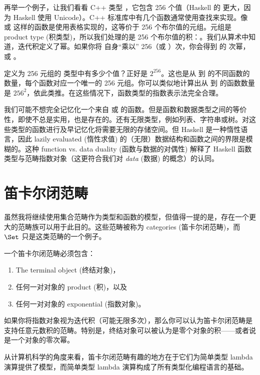 再举一个例子，让我们看看 C++ 类型 ，它包含 256 个值（Haskell 的  更大，因为 Haskell 使用 Unicode）。C++ 标准库中有几个函数通常使用查找来实现。像  或  这样的函数是使用表格实现的，这等价于 256 个布尔值的元组。元组是 product type (积类型)，所以我们处理的是 256 个布尔值的积：。我们从算术中知道，迭代积定义了幂。如果你将  自身“乘以” 256（或 ）次，你会得到  的  次幂，或 \textsuperscript{}。

定义为 256 元组的  类型中有多少个值？正好是 $2^{256}$。这也是从  到  的不同函数的数量，每个函数对应一个唯一的 256 元组。你可以类似地计算出从  到  的函数数量是 $256^{2}$，依此类推。在这些情况下，函数类型的指数表示法完全合理。

我们可能不想完全记忆化一个来自  或  的函数。但是函数和数据类型之间的等价性，即使不总是实用，也是存在的。还有无限类型，例如列表、字符串或树。对这些类型的函数进行及早记忆化将需要无限的存储空间。但 Haskell 是一种惰性语言，因此 lazily evaluated (惰性求值) 的（无限）数据结构和函数之间的界限是模糊的。这种 function vs. data duality (函数与数据的对偶性) 解释了 Haskell 函数类型与范畴指数对象（这更符合我们对 \emph{data} (数据) 的概念）的认同。

\section{笛卡尔闭范畴}

虽然我将继续使用集合范畴作为类型和函数的模型，但值得一提的是，存在一个更大的范畴族可以用于此目的。这些范畴被称为  categories (笛卡尔闭范畴)，而 $\Set$ 只是这类范畴的一个例子。

一个笛卡尔闭范畴必须包含：

\begin{enumerate}
  \tightlist
  \item
        The terminal object (终结对象)，
  \item
        任何一对对象的 product (积)，以及
  \item
        任何一对对象的 exponential (指数对象)。
\end{enumerate}
如果你将指数对象视为迭代积（可能无限多次），那么你可以认为笛卡尔闭范畴是支持任意元数积的范畴。特别是，终结对象可以被认为是零个对象的积——或者说是一个对象的零次幂。

从计算机科学的角度来看，笛卡尔闭范畴有趣的地方在于它们为简单类型 lambda 演算提供了模型，而简单类型 lambda 演算构成了所有类型化编程语言的基础。

